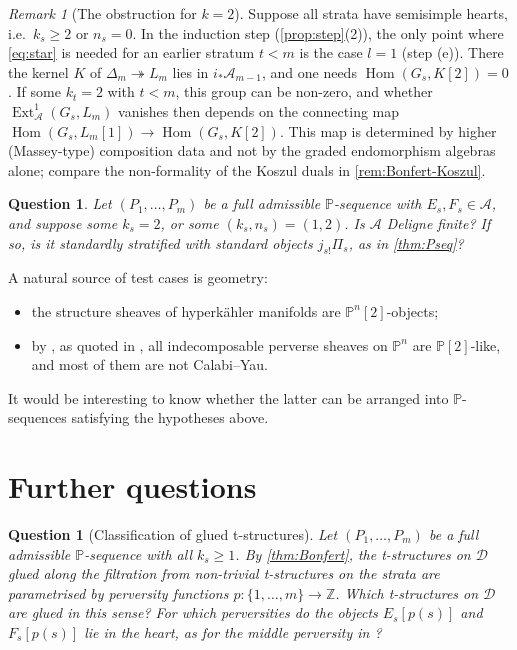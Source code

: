 \documentclass[11pt,reqno]{amsart}
\theoremstyle{plain}
\newtheorem{question}[theorem]{Question}
\theoremstyle{definition}
\theoremstyle{remark}
\newtheorem{remark}[theorem]{Remark}
\DeclareMathOperator{\Hom}{Hom}
\DeclareMathOperator{\Ext}{Ext}
\newcommand{\Pn}[2]{\mathbb{P}^{#1}[#2]}
\newcommand{\cD}{\mathcal{D}}
\newcommand{\cA}{\mathcal{A}}
\begin{document}
\begin{remark}[The obstruction for $k=2$]\label{rem:obstruction}
Suppose all strata have semisimple hearts, i.e.\ $k_s\ge2$ or $n_s=0$. In the induction step (\cref{prop:step}(2)), the only point where \eqref{eq:star} is needed for an earlier stratum $t<m$ is the case $l=1$ (step (e)). There the kernel $K$ of $\Delta_m\twoheadrightarrow L_m$ lies in $i_*\cA_{m-1}$, and one needs $\Hom(G_s,K[2])=0$. If some $k_t=2$ with $t<m$, this group can be non-zero, and whether $\Ext^1_\cA(G_s,L_m)$ vanishes then depends on the connecting map $\Hom(G_s,L_m[1])\to\Hom(G_s,K[2])$. This map is determined by higher (Massey-type) composition data and not by the graded endomorphism algebras alone; compare the non-formality of the Koszul duals in \cref{rem:Bonfert-Koszul}.
\end{remark}

\begin{question}\label{q:k2}
Let $(P_1,\dots,P_m)$ be a full admissible $\mathbb{P}$-sequence with $E_s,F_s\in\cA$, and suppose some $k_s=2$, or some $(k_s,n_s)=(1,2)$. Is $\cA$ Deligne finite? If so, is it standardly stratified with standard objects $j_{s!}\Pi_s$, as in \cref{thm:Pseq}?
\end{question}

A natural source of test cases is geometry:
\begin{itemize}
\item the structure sheaves of hyperk\"ahler manifolds are $\Pn n2$-objects;
\item by \cite[Thm.~B]{BC25}, as quoted in \cite{Bonf26}, all indecomposable perverse sheaves on $\mathbb{P}^n$ are $\mathbb{P}[2]$-like, and most of them are not Calabi--Yau.
\end{itemize}
It would be interesting to know whether the latter can be arranged into $\mathbb{P}$-sequences satisfying the hypotheses above.

\section{Further questions}\label{sec:questions}

\begin{question}[Classification of glued t-structures]\label{q:classification}
Let $(P_1,\dots,P_m)$ be a full admissible $\mathbb{P}$-sequence with all $k_s\ge1$. By \cref{thm:Bonfert}, the t-structures on $\cD$ glued along the filtration from non-trivial t-structures on the strata are parametrised by perversity functions $p\colon\{1,\dots,m\}\to\mathbb{Z}$. Which t-structures on $\cD$ are glued in this sense? For which perversities do the objects $E_s[p(s)]$ and $F_s[p(s)]$ lie in the heart, as for the middle perversity in \cite[\S5.1]{BB26}?
\end{question}
\end{document}
